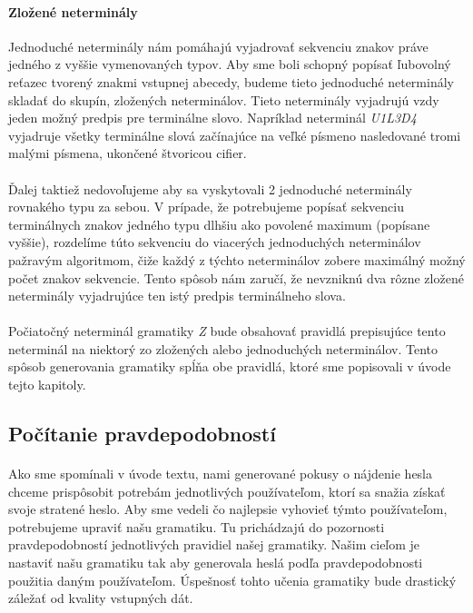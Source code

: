 \paragraph{Zložené neterminály}
Jednoduché neterminály nám pomáhajú vyjadrovať sekvenciu znakov práve jedného z vyššie vymenovaných typov. Aby sme boli schopný popísať ľubovolný reťazec tvorený znakmi vstupnej abecedy, budeme tieto jednoduché neterminály skladať do skupín, zložených neterminálov. Tieto neterminály vyjadrujú vzdy jeden možný predpis pre terminálne slovo. Napríklad neterminál \emph{U1L3D4} vyjadruje všetky terminálne slová začínajúce na veľké písmeno nasledované tromi malými písmena, ukončené štvoricou cifier.
\paragraph{}
Ďalej taktiež nedovoľujeme aby sa vyskytovali 2 jednoduché neterminály rovnakého typu za sebou. V prípade, že potrebujeme popísať sekvenciu terminálnych znakov jedného typu dlhšiu ako povolené maximum (popísane vyššie), rozdelíme túto sekvenciu do viacerých jednoduchých neterminálov pažravým algoritmom, čiže každý z týchto neterminálov zobere maximálný možný počet znakov sekvencie. Tento spôsob nám zaručí, že nevzniknú dva rôzne zložené neterminály vyjadrujúce ten istý predpis terminálneho slova.
\paragraph{}
Počiatočný neterminál gramatiky \emph{Z} bude obsahovať pravidlá prepisujúce tento neterminál na niektorý zo zložených alebo jednoduchých neterminálov. Tento spôsob generovania gramatiky spĺňa obe pravidlá, ktoré sme popisovali v úvode tejto kapitoly. 

\subsection{Počítanie pravdepodobností}
\paragraph{}
Ako sme spomínali v úvode textu, nami generované pokusy o nájdenie hesla chceme prispôsobit potrebám jednotlivých používateľom, ktorí sa snažia získať svoje stratené heslo. Aby sme vedeli čo najlepsie vyhovieť týmto používateľom, potrebujeme upraviť našu gramatiku. Tu prichádzajú do pozornosti pravdepodobností jednotlivých pravidiel našej gramatiky. Našim cieľom je nastaviť našu gramatiku tak aby generovala heslá podľa pravdepodobnosti použitia daným používateľom. Úspešnosť tohto učenia gramatiky bude drastický záležať od kvality vstupných dát.
